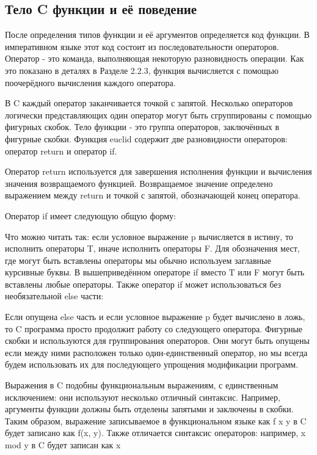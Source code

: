 \subsection{Тело C функции и её поведение}\label{FunctionBodyBehaviour}

После определения типов функции и её аргументов определяется код функции. В императивном языке этот код состоит из последовательности операторов. Оператор - это команда, выполняющая некоторую разновидность операции. Как это показано в деталях в Разделе 2.2.3, функция вычисляется с помощью поочерёдного вычисления каждого оператора.

В C каждый оператор заканчивается точкой с запятой. Несколько операторов логически представляющих один оператор могут быть сгруппированы с помощью фигурных скобок. Тело функции - это группа операторов, заключённых в фигурные скобки. Функция euclid содержит две разновидности операторов: оператор return и оператор if.

Оператор return используется для завершения исполнения функции и вычисления значения возвращаемого функцией. Возвращаемое значение определено выражением между return и точкой с запятой, обозначающей конец оператора.

Оператор if имеет следующую общую форму:

Что можно читать так: если условное выражение p вычисляется в истину, то исполнить операторы T, иначе исполнить операторы F. Для обозначения мест, где могут быть вставлены операторы мы обычно используем заглавные курсивные буквы. В вышеприведённом операторе if вместо T или F могут быть вставлены любые операторы. Также оператор if может использоваться без необязательной else части:

Если опущена else часть и если условное выражение p будет вычислено в ложь, то C программа просто продолжит работу со следующего оператора. Фигурные скобки { и } используются для группирования операторов. Они могут быть опущены если между ними расположен только один-единственный оператор, но мы всегда будем использовать их для последующего упрощения модификации программ. 

Выражения в C подобны функциональным выражениям, с единственным исключением: они используют несколько отличный синтаксис. Например, аргументы функции должны быть отделены запятыми и заключены в скобки. Таким образом, выражение записываемое в функциональном языке как f x y в C будет записано как f(x, y). Также отличается синтаксис операторов: например, x mod y в C будет записан как x%

